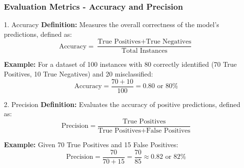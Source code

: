\documentclass[aspectratio=169]{beamer}
\begin{document}
\begin{frame}[fragile]
    \frametitle{Evaluation Metrics - Accuracy and Precision}
    \begin{block}{1. Accuracy}
        \textbf{Definition:} Measures the overall correctness of the model's predictions, defined as:
        \begin{equation}
            \text{Accuracy} = \frac{\text{True Positives} + \text{True Negatives}}{\text{Total Instances}}
        \end{equation}

        \textbf{Example:} For a dataset of 100 instances with 80 correctly identified (70 True Positives, 10 True Negatives) and 20 misclassified:
        \begin{equation}
            \text{Accuracy} = \frac{70 + 10}{100} = 0.80 \text{ or } 80\%
        \end{equation}
    \end{block}
    
    \begin{block}{2. Precision}
        \textbf{Definition:} Evaluates the accuracy of positive predictions, defined as:
        \begin{equation}
            \text{Precision} = \frac{\text{True Positives}}{\text{True Positives} + \text{False Positives}}
        \end{equation}

        \textbf{Example:} Given 70 True Positives and 15 False Positives:
        \begin{equation}
            \text{Precision} = \frac{70}{70 + 15} = \frac{70}{85} \approx 0.82 \text{ or } 82\%
        \end{equation}
    \end{block}
\end{frame}
\end{document}
